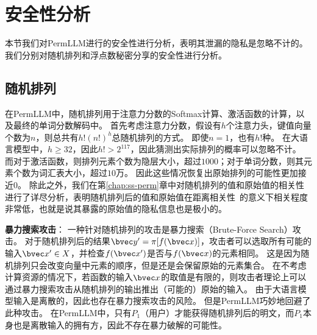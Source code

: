 \section{安全性分析}
本节我们对PermLLM进行的安全性进行分析，表明其泄漏的隐私是忽略不计的。
%
我们分别对随机排列和浮点数秘密分享的安全性进行分析。


\subsection{随机排列}
在PermLLM中，随机排列用于注意力分数的Softmax计算、激活函数的计算，以及最终的单词分数解码中。
%
首先考虑注意力分数，假设有$h$个注意力头，键值向量个数为$n$，则总共有$h!(n!)^h$总随机排列的方式。
即使$n=1$，也有$h!$种。
在大语言模型中，$h \ge 32$，因此$h! > 2^{117}$，因此猜测出实际排列的概率可以忽略不计。
%
而对于激活函数，则排列元素个数为隐层大小，超过$1000$；对于单词分数，则其元素个数为词汇表大小，超过$10$万。
因此这些情况恢复出原始排列的可能性更加接近0。
%
除此之外，我们在第\ref{chap:ss-perm}章中对随机排列的值和原始值的相关性进行了详尽分析，表明随机排列后的值和原始值在距离相关性~\cite{szekely2007dcor}的意义下相关程度非常低，也就是说其暴露的原始值的隐私信息也是极小的。


\textbf{暴力搜索攻击}：
一种针对随机排列的攻击是暴力搜索（Brute-Force Search）攻击。
对于随机排列后的结果$\bvec y' = \pi[f(\bvec x)]$，攻击者可以选取所有可能的输入$\bvec x' \in X$，并检查$f(\bvec x')$是否与$f(\bvec x)$的元素相同。
这是因为随机排列只会改变向量中元素的顺序，但是还是会保留原始的元素集合。
在不考虑计算资源的情况下，若函数的输入$\bvec x$的取值是有限的，则攻击者理论上可以通过暴力搜索攻击从随机排列的输出推出（可能的）原始的输入。
%
由于大语言模型输入是离散的，因此也存在暴力搜索攻击的风险。
但是PermLLM巧妙地回避了此种攻击。
%
在PermLLM中，只有$P_1$（用户）才能获得随机排列后的明文，而$P_1$本身也是离散输入的拥有方，因此不存在暴力破解的可能性。

